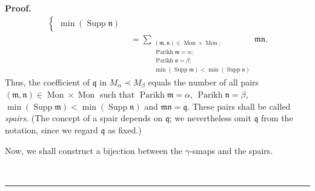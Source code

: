\documentclass[numbers=enddot,12pt,final,onecolumn,notitlepage,abstracton]{scrartcl}%
\theoremstyle{definition}
\newenvironment{proof}[1][Proof]{\noindent\textbf{#1.} }{\ \rule{0.5em}{0.5em}}
\newenvironment{verlong}{}{}
\let\sumnonlimits\sum
\renewcommand{\sum}{\sumnonlimits\limits}
\begin{document}
\begin{proof}
\begin{verlong}
\begin{align*}
\begin{cases}
\min\left(  \operatorname*{Supp}\mathfrak{n}\right)
\end{cases}
\\
&  =\sum_{\substack{\left(  \mathfrak{m},\mathfrak{n}\right)  \in
\operatorname*{Mon}\times\operatorname*{Mon};\\\operatorname*{Parikh}%
\mathfrak{m}=\alpha;\\\operatorname*{Parikh}\mathfrak{n}=\beta;\\\min\left(
\operatorname*{Supp}\mathfrak{m}\right)  <\min\left(  \operatorname*{Supp}%
\mathfrak{n}\right)  }}\mathfrak{mn}.
\end{align*}
Thus, the coefficient of $\mathfrak{q}$ in $M_{\alpha}\left.  \prec\right.
M_{\beta}$ equals the number of all pairs $\left(  \mathfrak{m},\mathfrak{n}%
\right)  \in\operatorname*{Mon}\times\operatorname*{Mon}$ such that
$\operatorname*{Parikh}\mathfrak{m}=\alpha$, $\operatorname*{Parikh}%
\mathfrak{n}=\beta$, $\min\left(  \operatorname*{Supp}\mathfrak{m}\right)
<\min\left(  \operatorname*{Supp}\mathfrak{n}\right)  $ and $\mathfrak{mn}%
=\mathfrak{q}$. These pairs shall be called \textit{spairs}. (The concept of a
spair depends on $\mathfrak{q}$; we nevertheless omit $\mathfrak{q}$ from the
notation, since we regard $\mathfrak{q}$ as fixed.)

Now, we shall construct a bijection between the $\gamma$-smaps and the spairs.


\end{verlong}
\end{proof}
\end{document}
